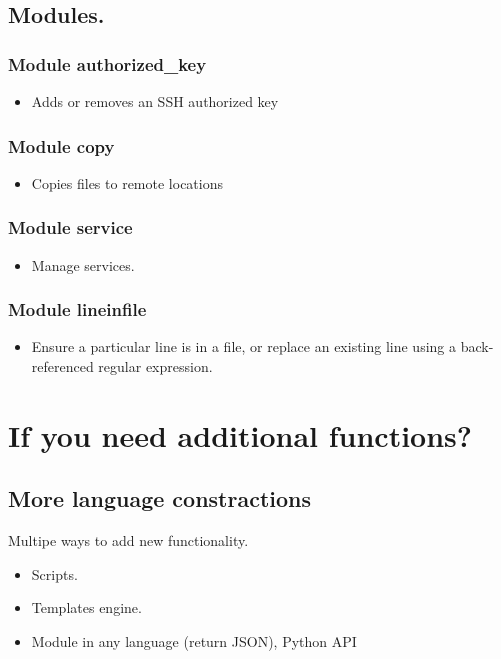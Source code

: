 \documentclass{beamer}
\begin{document}
\subsection{Modules.}

\begin{frame}[fragile]
\frametitle{Module authorized\_key}
  \begin{itemize}
  \item
  Adds or removes an SSH authorized key
  \end{itemize}
  
\end{frame}

\begin{frame}[fragile]
\frametitle{Module copy}
  \begin{itemize}
  \item
  Copies files to remote locations
  \end{itemize}
  
\end{frame}


\begin{frame}[fragile]
\frametitle{Module service}
  \begin{itemize}
  \item
  Manage services.
  \end{itemize}
  
  
\end{frame}

\begin{frame}[fragile]
\frametitle{Module lineinfile}
  \begin{itemize}
  \item
  Ensure a particular line is in a file, or replace an existing line using a
  back-referenced regular expression.
  \end{itemize}
  
\end{frame}

\section{If you need additional functions?}
\subsection {More language constractions}
\begin{frame}{Multipe ways to add new functionality.}
  \begin{itemize}
  \item
    Scripts.
  \item
    Templates engine.
  \item
    Module in any language (return JSON), Python API
  \end{itemize}
\end{frame}
\end{document}
